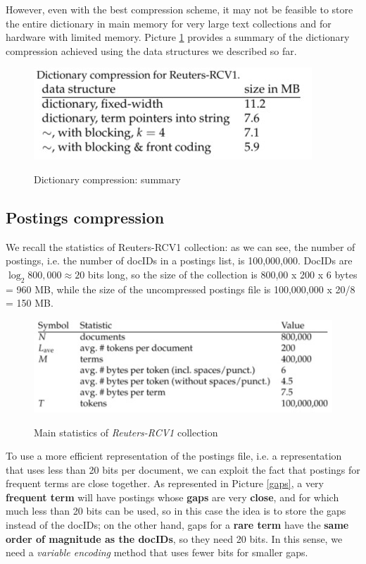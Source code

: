 However, even with the best compression scheme, it may not be feasible to store the entire dictionary in main memory for very large text collections and for hardware with limited memory. Picture \ref{summary} provides a summary of the dictionary compression achieved using the data structures we described so far.

\begin{figure}[h!]
		\centering
		\includegraphics[scale = 2.0]{img/summary compression.jpg}
		\label{summary}
        \caption{Dictionary compression: summary}
\end{figure}

\subsection{Postings compression}
We recall the statistics of Reuters-RCV1 collection: as we can see, the number of postings, i.e. the number of docIDs in a postings list, is 100,000,000. DocIDs are $\log_{2}800,000 \approx 20$ bits long, so the size of the collection is 800,00 x 200 x 6 bytes = 960 MB, while the size of the uncompressed postings file is 100,000,000 x 20/8 = 150 MB.

\begin{figure}[h!]
		\centering
		\includegraphics[scale = 1.5]{img/reuters.jpg}
		\label{reuters}
        \caption{Main statistics of \textit{Reuters-RCV1} collection}
\end{figure}

To use a more efficient representation of the postings file, i.e. a representation that uses less than 20 bits per document, we can exploit the fact that postings for frequent terms are close together. As represented in Picture \ref{gaps}, a very \textbf{frequent term} will have postings whose \textbf{gaps} are very \textbf{close}, and for which much less than 20 bits can be used, so in this case the idea is to store the gaps instead of the docIDs; on the other hand, gaps for a \textbf{rare term} have the \textbf{same order of magnitude as the docIDs}, so they need 20 bits. In this sense, we need a \textit{variable encoding} method that uses fewer bits for smaller gaps.

